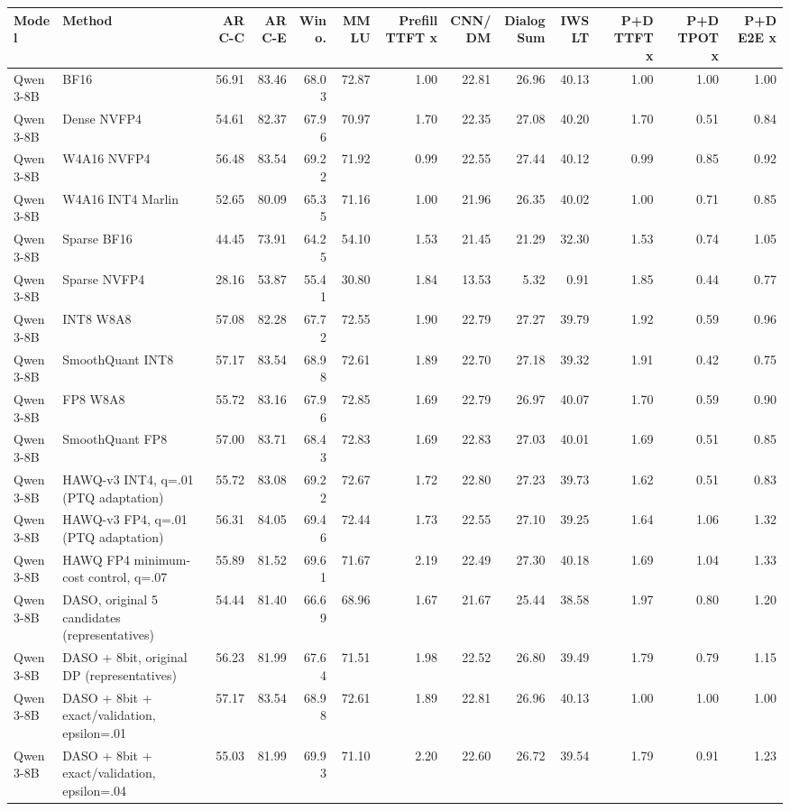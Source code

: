 \begin{tabular}{llrrrrrrrrrrr}
\hline
Model & Method & ARC-C & ARC-E & Wino. & MMLU & Prefill TTFT x & CNN/DM & DialogSum & IWSLT & P+D TTFT x & P+D TPOT x & P+D E2E x \\
\hline
Qwen3-8B & BF16 & 56.91 & 83.46 & 68.03 & 72.87 & 1.00 & 22.81 & 26.96 & 40.13 & 1.00 & 1.00 & 1.00 \\
Qwen3-8B & Dense NVFP4 & 54.61 & 82.37 & 67.96 & 70.97 & 1.70 & 22.35 & 27.08 & 40.20 & 1.70 & 0.51 & 0.84 \\
Qwen3-8B & W4A16 NVFP4 & 56.48 & 83.54 & 69.22 & 71.92 & 0.99 & 22.55 & 27.44 & 40.12 & 0.99 & 0.85 & 0.92 \\
Qwen3-8B & W4A16 INT4 Marlin & 52.65 & 80.09 & 65.35 & 71.16 & 1.00 & 21.96 & 26.35 & 40.02 & 1.00 & 0.71 & 0.85 \\
Qwen3-8B & Sparse BF16 & 44.45 & 73.91 & 64.25 & 54.10 & 1.53 & 21.45 & 21.29 & 32.30 & 1.53 & 0.74 & 1.05 \\
Qwen3-8B & Sparse NVFP4 & 28.16 & 53.87 & 55.41 & 30.80 & 1.84 & 13.53 & 5.32 & 0.91 & 1.85 & 0.44 & 0.77 \\
Qwen3-8B & INT8 W8A8 & 57.08 & 82.28 & 67.72 & 72.55 & 1.90 & 22.79 & 27.27 & 39.79 & 1.92 & 0.59 & 0.96 \\
Qwen3-8B & SmoothQuant INT8 & 57.17 & 83.54 & 68.98 & 72.61 & 1.89 & 22.70 & 27.18 & 39.32 & 1.91 & 0.42 & 0.75 \\
Qwen3-8B & FP8 W8A8 & 55.72 & 83.16 & 67.96 & 72.85 & 1.69 & 22.79 & 26.97 & 40.07 & 1.70 & 0.59 & 0.90 \\
Qwen3-8B & SmoothQuant FP8 & 57.00 & 83.71 & 68.43 & 72.83 & 1.69 & 22.83 & 27.03 & 40.01 & 1.69 & 0.51 & 0.85 \\
Qwen3-8B & HAWQ-v3 INT4, q=.01 (PTQ adaptation) & 55.72 & 83.08 & 69.22 & 72.67 & 1.72 & 22.80 & 27.23 & 39.73 & 1.62 & 0.51 & 0.83 \\
Qwen3-8B & HAWQ-v3 FP4, q=.01 (PTQ adaptation) & 56.31 & 84.05 & 69.46 & 72.44 & 1.73 & 22.55 & 27.10 & 39.25 & 1.64 & 1.06 & 1.32 \\
Qwen3-8B & HAWQ FP4 minimum-cost control, q=.07 & 55.89 & 81.52 & 69.61 & 71.67 & 2.19 & 22.49 & 27.30 & 40.18 & 1.69 & 1.04 & 1.33 \\
Qwen3-8B & DASO, original 5 candidates (representatives) & 54.44 & 81.40 & 66.69 & 68.96 & 1.67 & 21.67 & 25.44 & 38.58 & 1.97 & 0.80 & 1.20 \\
Qwen3-8B & DASO + 8bit, original DP (representatives) & 56.23 & 81.99 & 67.64 & 71.51 & 1.98 & 22.52 & 26.80 & 39.49 & 1.79 & 0.79 & 1.15 \\
Qwen3-8B & DASO + 8bit + exact/validation, epsilon=.01 & 57.17 & 83.54 & 68.98 & 72.61 & 1.89 & 22.81 & 26.96 & 40.13 & 1.00 & 1.00 & 1.00 \\
Qwen3-8B & DASO + 8bit + exact/validation, epsilon=.04 & 55.03 & 81.99 & 69.93 & 71.10 & 2.20 & 22.60 & 26.72 & 39.54 & 1.79 & 0.91 & 1.23 \\
\hline
\end{tabular}
